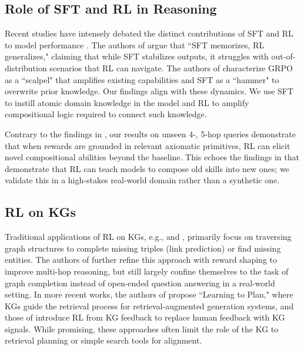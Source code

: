 \documentclass{article}
\theoremstyle{plain}
\theoremstyle{definition}
\theoremstyle{remark}
\begin{document}
\subsection{Role of SFT and RL in Reasoning}
Recent studies have intensely debated the distinct contributions of SFT and RL to model performance \citep{jin2025rl, kang2025quagmires, matsutani2025rl}. The authors of \cite{chu2025sft} argue that ``SFT memorizes, RL generalizes," claiming that while SFT stabilizes outputs, it struggles with out-of-distribution scenarios that RL can navigate. The authors of \cite{Rajani2025} characterize GRPO as a ``scalpel" that amplifies existing capabilities and SFT as a ``hammer" to overwrite prior knowledge. Our findings align with these dynamics. We use SFT to instill atomic domain knowledge in the model and RL to amplify compositional logic required to connect such knowledge.


Contrary to the findings in \cite{yue2025does}, our results on unseen 4-, 5-hop queries demonstrate that when rewards are grounded in relevant axiomatic primitives, RL can elicit novel compositional abilities beyond the baseline. This echoes the findings in \cite{yuan2025f} that demonstrate that RL can teach models to compose old skills into new ones; we validate this in a high-stakes real-world domain rather than a synthetic one. 

\subsection{RL on KGs}
Traditional applications of RL on KGs, e.g., \cite{DasGOLEARNING} and \cite{xiong2017deeppath}, primarily focus on traversing graph structures to complete missing triples (link prediction) or find missing entities. The authors of \cite{lin2018multi} further refine this approach with reward shaping to improve multi-hop reasoning, but still largely confine themselves to the task of graph completion instead of open-ended question answering in a real-world setting. In more recent works, the authors of \cite{Wang2024} propose ``Learning to Plan," where KGs guide the retrieval process for retrieval-augmented generation systems, and those of \cite{YanRLKGF} introduce RL from KG feedback to replace human feedback with KG signals. While promising, these approaches often limit the role of the KG to retrieval planning or simple search tools for alignment.
\end{document}
